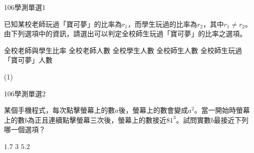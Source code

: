 \begin{QUESTIONS}
    \begin{QUESTION}
        \begin{ExamInfo}{106}{學測}{單選}{1}
        \end{ExamInfo}
        \begin{ExamAnsRateInfo}{53}{82}{52}{25}
        \end{ExamAnsRateInfo}
        \begin{QBODY}
            已知某校老師玩過「寶可夢」的比率為${{r}_{1}}$，而學生玩過的比率為${{r}_{2}}$，其中${{r}_{1}}\ne {{r}_{2}}$。
            由下列選項中的資訊，請選出可以判定全校師生玩過「寶可夢」的比率之選項。
            \begin{QOPS}
                \QOP 全校老師與學生比率     
                \QOP 全校老師人數
                \QOP 全校學生人數
                \QOP 全校師生人數
                \QOP 全校師生玩過「寶可夢」人數
            \end{QOPS}
        \end{QBODY}
        \begin{QFROMS}
        \end{QFROMS}
        \begin{QTAGS}\end{QTAGS}
        \begin{QANS}
            (1)
        \end{QANS}
        \begin{QSOLLIST}
        \end{QSOLLIST}
        \begin{QEMPTYSPACE}
        \end{QEMPTYSPACE}
    \end{QUESTION}
    \begin{QUESTION}
        \begin{ExamInfo}{106}{學測}{單選}{2}
        \end{ExamInfo}
        \begin{ExamAnsRateInfo}{51}{84}{52}{17}
        \end{ExamAnsRateInfo}
        \begin{QBODY}
            某個手機程式，每次點擊螢幕上的數$a$後，螢幕上的數會變成${{a}^{2}}$。當一開始時螢幕上的數$b$為正且連續點擊螢幕三次後，螢幕上的數接近${{81}^{3}}$。試問實數$b$最接近下列哪一個選項？
			\begin{QOPS}
				\QOP $1.7$      
				\QOP $3$      
				\QOP $5.2$      

\end{QOPS}
\end{QBODY}
\end{QUESTION}
\end{QUESTIONS}
